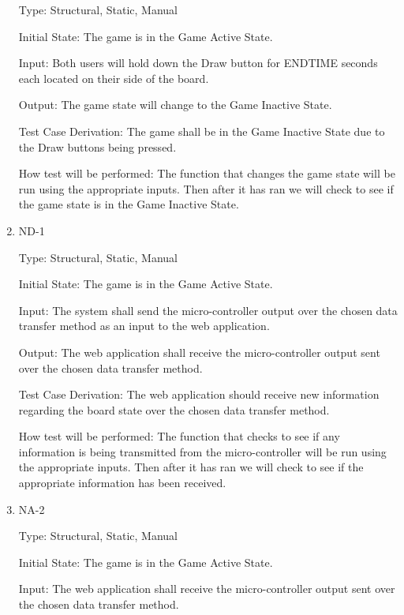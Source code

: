 \documentclass[12pt, titlepage]{article}
\begin{document}
\begin{enumerate}
    Type: Structural, Static, Manual
                      
    Initial State: The game is in the Game Active State.
                        
    Input: Both users will hold down the Draw button for ENDTIME seconds each located on their side of the board.
                        
    Output: The game state will change to the Game Inactive State.
                        
    Test Case Derivation: The game shall be in the Game Inactive State due to the Draw buttons being pressed.
    
    How test will be performed: The function that changes the game state will be run using the appropriate inputs.
    Then after it has ran we will check to see if the game state is in the Game Inactive State.

    \item{ND-1\\}

    Type: Structural, Static, Manual
                      
    Initial State: The game is in the Game Active State.
                        
    Input: The system shall send the micro-controller output over the chosen data transfer
    method as an input to the web application.
                        
    Output: The web application shall receive the micro-controller output sent over the chosen data transfer
    method.
                        
    Test Case Derivation: The web application should receive new information regarding the board state over the chosen data transfer method. 

    How test will be performed: The function that checks to see if any information is being transmitted from the micro-controller
    will be run using the appropriate inputs. Then after it has ran we will check to see if the appropriate information has been received.

    \item{NA-2\\}

    Type: Structural, Static, Manual
                      
    Initial State: The game is in the Game Active State.
                        
    Input: The web application shall receive the micro-controller output sent over the chosen data transfer
    method.
                        

\end{enumerate}
\end{document}
